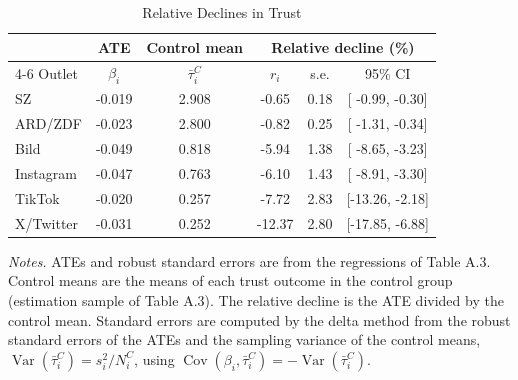 \begin{table}[H]
\centering
\caption{Relative Declines in Trust}
\label{tab:relative_declines}
\begin{tabular}{lccccc}
\toprule
 & ATE & Control mean & \multicolumn{3}{c}{Relative decline (\%)} \\
\cmidrule(lr){4-6}
Outlet & $\beta_i$ & $\bar{\tau}_i^C$ & $r_i$ & s.e. & 95\% CI \\
\midrule
SZ & -0.019 & 2.908 &  -0.65 & 0.18 & [ -0.99,  -0.30] \\
ARD/ZDF & -0.023 & 2.800 &  -0.82 & 0.25 & [ -1.31,  -0.34] \\
Bild & -0.049 & 0.818 &  -5.94 & 1.38 & [ -8.65,  -3.23] \\
Instagram & -0.047 & 0.763 &  -6.10 & 1.43 & [ -8.91,  -3.30] \\
TikTok & -0.020 & 0.257 &  -7.72 & 2.83 & [-13.26,  -2.18] \\
X/Twitter & -0.031 & 0.252 & -12.37 & 2.80 & [-17.85,  -6.88] \\
\bottomrule
\end{tabular}
\par
\begin{minipage}{\linewidth}
\baselineskip9pt {\scriptsize \vspace{0.1cm} {\it Notes.} ATEs and robust standard errors are from the regressions of Table A.3. Control means are the means of each trust outcome in the control group (estimation sample of Table A.3). The relative decline is the ATE divided by the control mean. Standard errors are computed by the delta method from the robust standard errors of the ATEs and the sampling variance of the control means, $\operatorname{Var}(\bar{\tau}_i^C)=s_i^2/N_i^C$, using $\operatorname{Cov}(\beta_i,\bar{\tau}_i^C)=-\operatorname{Var}(\bar{\tau}_i^C)$.}
\end{minipage}
\end{table}
